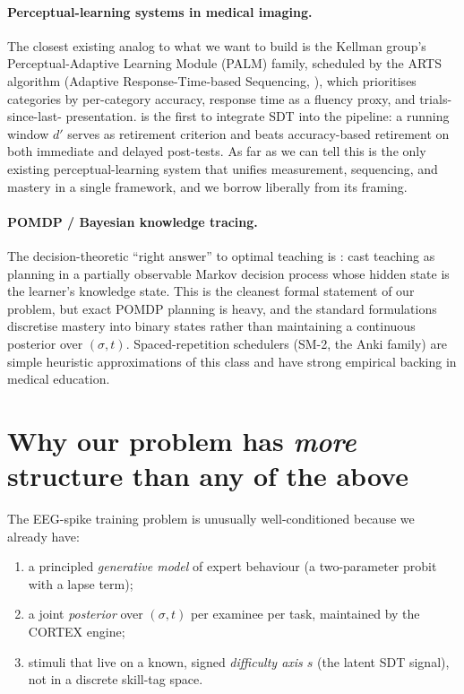 \documentclass[11pt]{article}
\begin{document}
\paragraph{Perceptual-learning systems in medical imaging.}
The closest existing analog to what we want to build is the Kellman
group's Perceptual-Adaptive Learning Module (PALM) family, scheduled by
the ARTS algorithm (Adaptive Response-Time-based Sequencing,
\citealp{mettler2011arts}), which prioritises categories by per-category
accuracy, response time as a fluency proxy, and trials-since-last-
presentation. \citet{kellman2024palm} is the first to integrate SDT
into the pipeline: a running window $d'$ serves as retirement criterion
and beats accuracy-based retirement on both immediate and delayed
post-tests. As far as we can tell this is the only existing
perceptual-learning system that unifies measurement, sequencing, and
mastery in a single framework, and we borrow liberally from its
framing.

\paragraph{POMDP / Bayesian knowledge tracing.}
The decision-theoretic ``right answer'' to optimal teaching is
\citet{rafferty2016pomdp}: cast teaching as planning in a partially
observable Markov decision process whose hidden state is the learner's
knowledge state. This is the cleanest formal statement of our problem,
but exact POMDP planning is heavy, and the standard formulations
discretise mastery into binary states rather than maintaining a
continuous posterior over $(\sigma,t)$. Spaced-repetition schedulers
(SM-2, the Anki family) are simple heuristic approximations of this
class and have strong empirical backing in medical education.

\section{Why our problem has \emph{more} structure than any of the above}
\label{sec:structure}

The EEG-spike training problem is unusually well-conditioned because
we already have:

\begin{enumerate}[leftmargin=*,itemsep=2pt]
  \item a principled \emph{generative model} of expert behaviour
        (a two-parameter probit with a lapse term);
  \item a joint \emph{posterior} over $(\sigma,t)$ per examinee per
        task, maintained by the CORTEX engine;
  \item stimuli that live on a known, signed \emph{difficulty axis $s$}
        (the latent SDT signal), not in a discrete skill-tag space.
\end{enumerate}
\end{document}
